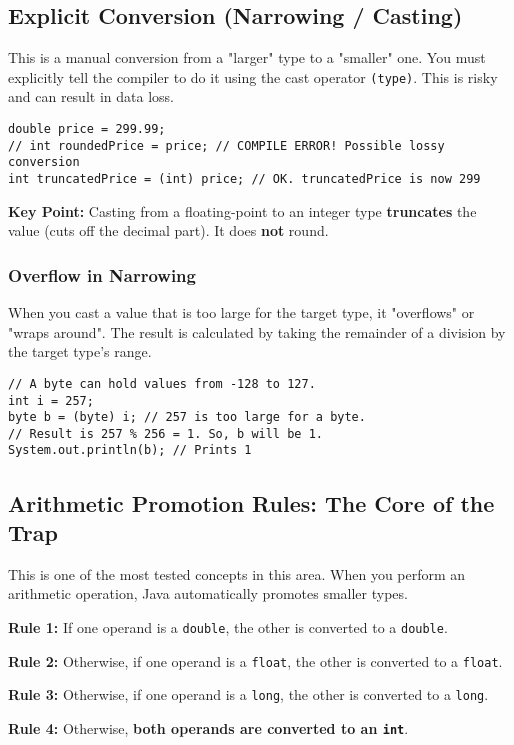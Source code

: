 \documentclass[12pt]{article}
\begin{document}
\begin{enumerate}[label=(\arabic*)]
\subsection*{Explicit Conversion (Narrowing / Casting)}
This is a manual conversion from a "larger" type to a "smaller" one. You must explicitly tell the compiler to do it using the cast operator \texttt{(type)}. This is risky and can result in data loss.

\begin{verbatim}
double price = 299.99;
// int roundedPrice = price; // COMPILE ERROR! Possible lossy conversion
int truncatedPrice = (int) price; // OK. truncatedPrice is now 299
\end{verbatim}
\textbf{Key Point:} Casting from a floating-point to an integer type \textbf{truncates} the value (cuts off the decimal part). It does \textbf{not} round.

\subsubsection*{Overflow in Narrowing}
When you cast a value that is too large for the target type, it "overflows" or "wraps around". The result is calculated by taking the remainder of a division by the target type's range.
\begin{verbatim}
// A byte can hold values from -128 to 127.
int i = 257;
byte b = (byte) i; // 257 is too large for a byte.
// Result is 257 % 256 = 1. So, b will be 1.
System.out.println(b); // Prints 1
\end{verbatim}

\subsection*{Arithmetic Promotion Rules: The Core of the Trap}
This is one of the most tested concepts in this area. When you perform an arithmetic operation, Java automatically promotes smaller types.

\textbf{Rule 1:} If one operand is a \texttt{double}, the other is converted to a \texttt{double}.

\textbf{Rule 2:} Otherwise, if one operand is a \texttt{float}, the other is converted to a \texttt{float}.

\textbf{Rule 3:} Otherwise, if one operand is a \texttt{long}, the other is converted to a \texttt{long}.

\textbf{Rule 4:} Otherwise, \textbf{both operands are converted to an \texttt{int}}.


\end{enumerate}
\end{document}
